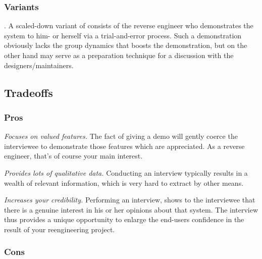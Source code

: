 \documentclass[a4paper,10pt,twoside]{book}
\begin{document}
\subsubsection*{Variants}

.
A scaled-down variant of  consists of the reverse engineer who demonstrates the system to him- or herself via a trial-and-error process. Such a demonstration obviously lacks the group dynamics that boosts the demonstration, but on the other hand may serve as a preparation technique for a discussion with the designers/maintainers.

\subsection*{Tradeoffs}

\subsubsection*{Pros}

\begin{bulletlist}
  \item \emph{Focuses on valued features.}
The fact of giving a demo will gently coerce the interviewee to demonstrate those features which are appreciated. As a reverse engineer, that's of course your main interest.

  \item \emph{Provides lots of qualitative data.}
Conducting an interview typically results in a wealth of relevant information, which is very hard to extract by other means. 

  \item \emph{Increases your credibility.}
Performing an interview, shows to the interviewee that there is a genuine interest in his or her opinions about that system. The interview thus provides a unique opportunity to enlarge the end-users confidence in the result of your reengineering project.
\end{bulletlist}

\subsubsection*{Cons}
\end{document}
